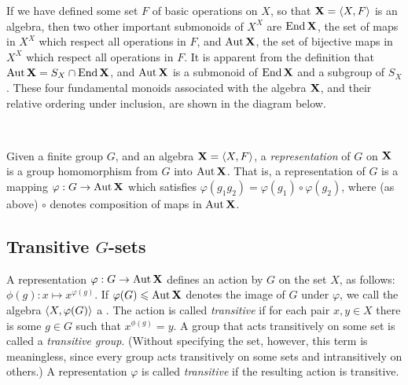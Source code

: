 If we have defined some set $F$ of basic operations on $X$, so that
$\mathbf{X} = \langle X, F\rangle$ is an algebra, then two other important submonoids of
$X^X$ are $\operatorname{End} \mathbf{X}$, the set of maps in $X^X$ which respect all 
operations in $F$, and $\operatorname{Aut} \mathbf{X}$, the set of bijective maps in  $X^X$ which
respect all operations in $F$.  It is apparent from the definition that
$\operatorname{Aut}\mathbf{X}= S_X \cap \operatorname{End} \mathbf{X}$, and  $\operatorname{Aut}\mathbf{X}$ is a submonoid of $\operatorname{End} \mathbf{X}$
and a subgroup of $S_X$.  These four fundamental monoids associated with the
algebra $\mathbf{X}$, and their relative ordering under inclusion, are shown in the diagram
below. 

\begin{figure}
\begin{center}
\end{center}
\caption{ \ }
\end{figure}



Given a finite group $G$, and an algebra $\mathbf{X} = \langle X, F\rangle$, a
%
\emph{representation} of $G$ on $\mathbf{X}$ is a group homomorphism
from $G$ into $\operatorname{Aut}\mathbf{X}$.  That is, a representation of $G$ is a mapping
$\varphi : G \rightarrow \operatorname{Aut}\mathbf{X}$ which satisfies $\varphi(g_1 g_2) =
\varphi(g_1) \circ \varphi(g_2)$, where (as above) $\circ$ denotes composition
of maps in $\operatorname{Aut}\mathbf{X}$.

\subsection{Transitive $G$-sets}
A representation $\varphi : G \rightarrow \operatorname{Aut}\mathbf{X}$ defines an action by $G$ on the
set $X$, as follows: $\phi(g): x \mapsto x^{\varphi(g)}$.  If $\varphi(G) \leqslant
\operatorname{Aut}\mathbf{X}$
denotes the image of $G$ under $\varphi$, we call the algebra $\langle X, \varphi(G)\rangle$
a .
The action is called
%
\emph{transitive} if for each pair $x, y \in X$ there is some $g\in
G$ such that $x^{\phi(g)} = y$. 
A group that acts transitively on some set is called a 
%
\emph{transitive group}.
(Without specifying the set, however, this term is meaningless, since
every group acts transitively on some sets and intransitively on others.)
A representation $\varphi$ is called \emph{transitive} if the resulting action
is transitive. 


